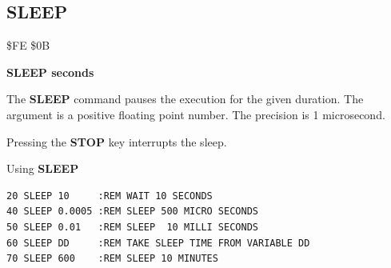 
\newpage
\subsection{SLEEP}
\begin{description}[leftmargin=2cm,style=nextline]
\item [Token:] \$FE \$0B
\item [Format:] {\bf SLEEP seconds}
\item [Usage:] The {\bf SLEEP} command pauses the execution
               for the given duration. The argument is a
               positive floating point number.
               The precision is 1 microsecond.
\item [Remarks:] Pressing the {\bf STOP} key interrupts the sleep.

\item [Example:] Using {\bf SLEEP}
\begin{tcolorbox}[colback=black,coltext=white]
\verbatimfont{\codefont}
\begin{verbatim}
20 SLEEP 10     :REM WAIT 10 SECONDS
40 SLEEP 0.0005 :REM SLEEP 500 MICRO SECONDS
50 SLEEP 0.01   :REM SLEEP  10 MILLI SECONDS
60 SLEEP DD     :REM TAKE SLEEP TIME FROM VARIABLE DD
70 SLEEP 600    :REM SLEEP 10 MINUTES
\end{verbatim}
\end{tcolorbox}
\end{description}


\newpage
